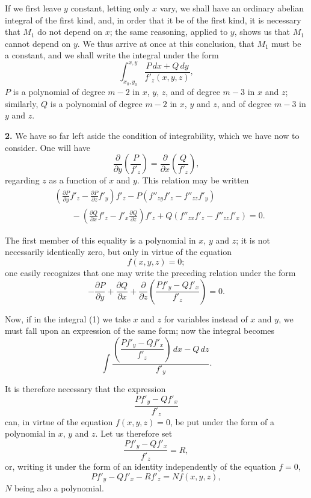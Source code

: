 \documentclass{article}
\begin{document}
If we first leave $y$ constant, letting only $x$ vary, we shall have an ordinary abelian integral of the first kind, and, in order that it be of the first kind, it is necessary that $M_{1}$ do not depend on $x$; the same reasoning, applied to $y$, shows us that $M_{1}$ cannot depend on $y$. We thus arrive at once at this conclusion, that $M_{1}$ must be a constant, and we shall write the integral under the form
\[
\int_{x_{0}, y_{0}}^{x, y} \frac{P\,dx + Q\,dy}{f'_{z}(x, y, z)}, \tag{1}
\]
$P$ is a polynomial of degree $m - 2$ in $x$, $y$, $z$, and of degree $m - 3$ in $x$ and $z$; similarly, $Q$ is a polynomial of degree $m - 2$ in $x$, $y$ and $z$, and of degree $m - 3$ in $y$ and $z$.

\textbf{2.} We have so far left aside the condition of integrability, which we have now to consider. One will have
\[
\frac{\partial}{\partial y}\left(\frac{P}{f'_{z}}\right) = \frac{\partial}{\partial x}\left(\frac{Q}{f'_{z}}\right),
\]
regarding $z$ as a function of $x$ and $y$. This relation may
be written
\[
\begin{aligned}
&\left(\frac{\partial P}{\partial y}f'_{z} - \frac{\partial P}{\partial z}f'_{y}\right)f'_{z} - P(f''_{zy}f'_{z} - f''_{zz}f'_{y}) \\
&\qquad - \left(\frac{\partial Q}{\partial x}f'_{z} - f'_{x}\frac{\partial Q}{\partial z}\right)f'_{z} + Q(f''_{zx}f'_{z} - f''_{zz}f'_{x}) = 0.
\end{aligned}
\]

The first member of this equality is a polynomial in $x$, $y$ and $z$; it is not necessarily identically zero, but only in virtue of the equation
\[
f(x, y, z) = 0;
\]
one easily recognizes that one may write the preceding relation under the form
\[
-\frac{\partial P}{\partial y} + \frac{\partial Q}{\partial x} + \frac{\partial}{\partial z}\left(\frac{Pf'_{y} - Qf'_{x}}{f'_{z}}\right) = 0. \tag{1}
\]

Now, if in the integral (1) we take $x$ and $z$ for variables instead of $x$ and $y$, we must fall upon an expression of the same form; now the integral becomes
\[
\int \frac{\left(\dfrac{Pf'_{y} - Qf'_{x}}{f'_{z}}\right)\,dx - Q\,dz}{f'_{y}}.
\]

It is therefore necessary that the expression
\[
\frac{Pf'_{y} - Qf'_{x}}{f'_{z}}
\]
can, in virtue of the equation $f(x, y, z) = 0$, be put under the form of a polynomial in $x$, $y$ and $z$. Let us therefore set
\[
\frac{Pf'_{y} - Qf'_{x}}{f'_{z}} = R,
\]
or, writing it under the form of an identity independently of the equation $f = 0$,
\[
Pf'_{y} - Qf'_{x} - Rf'_{z} = Nf(x, y, z), \tag{2}
\]
$N$ being also a polynomial.
\end{document}
